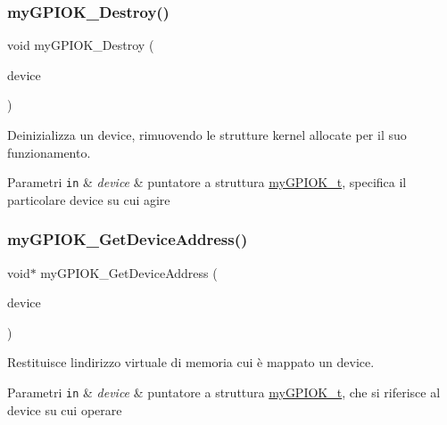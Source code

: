 \subsubsection{\texorpdfstring{my\+G\+P\+I\+O\+K\+\_\+\+Destroy()}{myGPIOK\_Destroy()}}
{\footnotesize\ttfamily void my\+G\+P\+I\+O\+K\+\_\+\+Destroy (\begin{DoxyParamCaption}\item[{\hyperlink{structmy_g_p_i_o_k__t}{my\+G\+P\+I\+O\+K\+\_\+t} $\ast$}]{device }\end{DoxyParamCaption})}



Deinizializza un device, rimuovendo le strutture kernel allocate per il suo funzionamento. 


\begin{DoxyParams}[1]{Parametri}
\mbox{\tt in}  & {\em device} & puntatore a struttura \hyperlink{structmy_g_p_i_o_k__t}{my\+G\+P\+I\+O\+K\+\_\+t}, specifica il particolare device su cui agire \\
\hline
\end{DoxyParams}
\mbox{\label{group__my_g_p_i_o_k__t_ga565ffd4946b330b29e1166dfc9851b11}} 
\subsubsection{\texorpdfstring{my\+G\+P\+I\+O\+K\+\_\+\+Get\+Device\+Address()}{myGPIOK\_GetDeviceAddress()}}
{\footnotesize\ttfamily void$\ast$ my\+G\+P\+I\+O\+K\+\_\+\+Get\+Device\+Address (\begin{DoxyParamCaption}\item[{\hyperlink{structmy_g_p_i_o_k__t}{my\+G\+P\+I\+O\+K\+\_\+t} $\ast$}]{device }\end{DoxyParamCaption})}



Restituisce l\textquotesingle{}indirizzo virtuale di memoria cui è mappato un device. 


\begin{DoxyParams}[1]{Parametri}
\mbox{\tt in}  & {\em device} & puntatore a struttura \hyperlink{structmy_g_p_i_o_k__t}{my\+G\+P\+I\+O\+K\+\_\+t}, che si riferisce al device su cui operare \\
\hline
\end{DoxyParams}
\mbox{\label{group__my_g_p_i_o_k__t_gae428f50a6da69e3cf89348b8ba9401b1}} 
